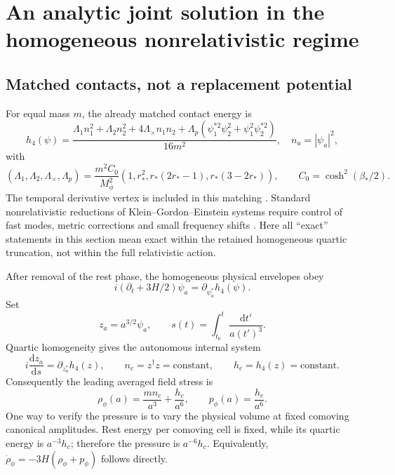 \documentclass[11pt]{article}
\newcommand{\dd}{\mathrm d}
\newcommand{\mf}{M_\phi}
\begin{document}
\section{An analytic joint solution in the homogeneous nonrelativistic regime}
\subsection{Matched contacts, not a replacement potential}
For equal mass $m$, the already matched contact energy is
\begin{equation}
 h_4(\psi)=\frac{\Lambda_1n_1^2+\Lambda_2n_2^2+4\Lambda_\times n_1n_2
       +\Lambda_p(\psi_1^{*2}\psi_2^2+\psi_1^2\psi_2^{*2})}{16m^2},
 \quad n_a=|\psi_a|^2,
 \label{ext:h4}
\end{equation}
with
\begin{equation}
 (\Lambda_1,\Lambda_2,\Lambda_\times,\Lambda_p)
 =\frac{m^2C_0}{\mf^2}
    (1,r_*^2,r_*(2r_*-1),r_*(3-2r_*)),\qquad C_0=\cosh^2(\beta_*/2).
 \label{ext:contacts}
\end{equation}
The temporal derivative vertex is included in this matching \cite[Sections S6--S7]{cubicsupp}. Standard nonrelativistic reductions of Klein--Gordon--Einstein systems require control of fast modes, metric corrections and small frequency shifts \cite{salehian}. Here all ``exact'' statements in this section mean exact within the retained homogeneous quartic truncation, not within the full relativistic action.

After removal of the rest phase, the homogeneous physical envelopes obey
\begin{equation}
 i(\partial_t+3H/2)\psi_a=\partial_{\psi_a^*}h_4(\psi).
\end{equation}
Set
\begin{equation}
 z_a=a^{3/2}\psi_a,\qquad
 s(t)=\int_{t_0}^t\frac{\dd t'}{a(t')^3}.
 \label{ext:clock}
\end{equation}
Quartic homogeneity gives the autonomous internal system
\begin{equation}
 \boxed{i\frac{\dd z_a}{\dd s}=\partial_{z_a^*}h_4(z),\qquad
       n_c=z^\dagger z=\text{constant},\qquad
       h_c=h_4(z)=\text{constant}.}\label{ext:internal}
\end{equation}
Consequently the leading averaged field stress is
\begin{equation}
 \boxed{\rho_\phi(a)=\frac{m n_c}{a^3}+\frac{h_c}{a^6},\qquad
        p_\phi(a)=\frac{h_c}{a^6}.}\label{ext:rhoavg}
\end{equation}
One way to verify the pressure is to vary the physical volume at fixed comoving canonical amplitudes. Rest energy per comoving cell is fixed, while its quartic energy is $a^{-3}h_c$; therefore the pressure is $a^{-6}h_c$. Equivalently, $\dot\rho_\phi=-3H(\rho_\phi+p_\phi)$ follows directly.
\end{document}
